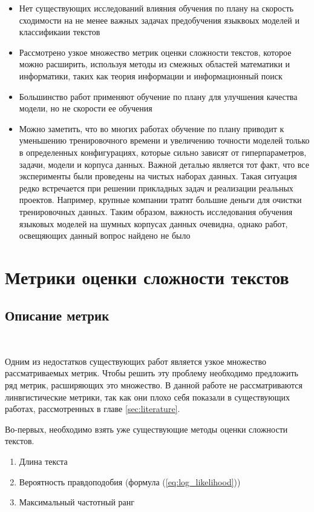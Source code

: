 \documentclass{spbau-diploma}
\begin{document}
\begin{itemize}
	\item Нет существующих исследований влияния обучения по плану на скорость сходимости на не менее важных задачах предобучения языквоых моделей и классификаии текстов
	\item Рассмотрено узкое множество метрик оценки сложности текстов, которое можно расширить, используя методы из смежных областей математики и информатики, таких как теория информации и информационный поиск
	\item Большинство работ применяют обучение по плану для улучшения качества модели, но не скорости ее обучения
	\item Можно заметить, что во многих работах обучение по плану приводит к уменьшению тренировочного времени и увеличению точности моделей только в определенных конфигурациях, которые сильно зависят от гиперпараметров, задачи, модели и корпуса данных. Важной деталью является тот факт, что все эксперименты были проведены на чистых наборах данных. Такая ситуация редко встречается при решении прикладных задач и реализации реальных проектов. Например, крупные компании тратят большие деньги для очистки тренировочных данных. Таким образом, важность исследования обучения языковых моделей на шумных корпусах данных очевидна, однако работ, освещяющих данный вопрос найдено не было
\end{itemize}

\section{Метрики оценки сложности текстов}
\subsection{Описание метрик}
\ 

Одним из недостатков существующих работ является узкое множество рассматриваемых метрик. Чтобы решить эту проблему необходимо предложить ряд метрик, расширяющих это множество. В данной работе не рассматриваются линвгистические метрики, так как они плохо себя показали в существующих работах, рассмотренных в главе \ref{sec:literature}.

Во-первых, необходимо взять уже существующие методы оценки сложности текстов.
\begin{enumerate}
	\item Длина текста
	\item Вероятность правдоподобия (формула (\ref{eq:log_likelihood}))
	\item Максимальный частотный ранг
\end{enumerate}
\end{document}
